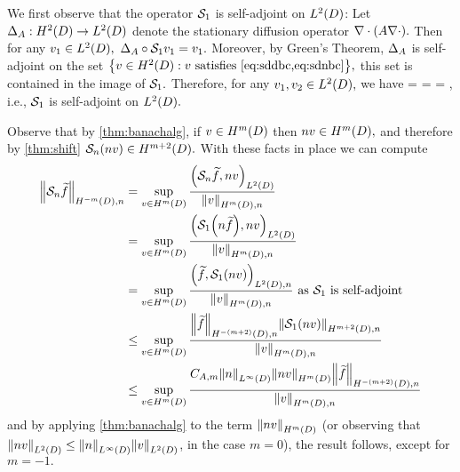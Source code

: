 We first observe that the operator $\mathcal S_{1}$ is self-adjoint on $\LtD$: Let $\DeltaA:\HtD\rightarrow\LtD$ denote the stationary diffusion operator $\grad\cdot\mleft(A\grad\cdot\mright).$ Then for any $\vo \in \LtD,$ $\Delta_{A} \circ \mathcal S_{1} v_{1} = v_{1}.$ Moreover, by Green's Theorem, $\Delta_{A}$ is self-adjoint on the set $\set{v \in \HtD \st v \text{ satisfies }\cref{eq:sddbc,eq:sdnbc}},$ this set is contained in the image of $\mathcal S_{1}.$ Therefore, for any $\vo,\vt \in \LtD,$ we have
\beqs
\IPLtD{\sdsolo \vo}{\vt} =\IPLtD{\sdsolo \vo}{\DeltaA \circ \sdsolo \vt} = \IPLtD{\DeltaA \circ \sdsolo \vo}{\sdsolo \vt} = \IPLtD{\vo}{\sdsolo \vt},
\eeqs
i.e., $\mathcal S_{1}$ is self-adjoint on $\LtD.$

Observe that by \cref{thm:banachalg}, if $v \in \HmD$ then $nv \in \HmD,$ and therefore by \cref{thm:shift} $\sdsol(nv) \in \HmptD.$ With these facts in place we can compute
\begin{align*}
\NHnfn{-m}{D}{\sdsol \ftilde} &= \sup_{v \in \HmD} \frac{\IPLtD{\sdsol \ftilde}{nv}}{\NHmDn{v}}\\
&= \sup_{v \in \HmD} \frac{\IPLtD{\sdsolo\mleft(n \ftilde\mright)}{nv}}{\NHmDn{v}}\\
&= \sup_{v \in \HmD} \frac{\IPLtDn{\ftilde}{\sdsolo\mleft(n v\mright)}}{\NHmDn{v}}\tas \sdsolo \text{ is self-adjoint}\\
&\leq \sup_{v \in \HmD} \frac{\NHnfn{-(m+2)}{D}{\ftilde}\NHnfn{m+2}{D}{\sdsolo\mleft(nv\mright)} }{\NHmDn{v}}\\
&\leq \sup_{v \in \HmD}  \frac{\CAfn{m} \NLiD{n} \NHmD{nv} \NHnfn{-(m+2)}{D}{\ftilde}}{\NHmDn{v}}
\end{align*}
and by applying \cref{thm:banachalg} to the term $\NHfn{m}{D}{nv}$ (or observing that $\NLtD{nv} \leq \NLiD{n}\NLtD{v}$, in the case $m=0$), the result follows, except for $m=-1.$


